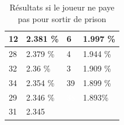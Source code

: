 \documentclass[letterpaper]{article}
\begin{document}
\begin{table}[h]
\begin{tabular}{|l|l||l|l|}
	  \cellcolor[HTML]{FF69B4} 12 & 2.381 \%  & \cellcolor[HTML]{E6E6FA}  6 & 1.997 \% \\ \hline
	  \cellcolor[HTML]{FFD700} 28 & 2.379 \%  & \cellcolor[HTML]{A0522D}  4 & 1.944 \% \\ \hline
	  \cellcolor[HTML]{2E8B57} 32 & 2.36 \%   & \cellcolor[HTML]{EEEED1}  3 & 1.909 \% \\ \hline
	  \cellcolor[HTML]{EEEED1} 34 & 2.354 \%  & \cellcolor[HTML]{8B1A1A} 39 & 1.899 \% \\ \hline
	  \cellcolor[HTML]{FFFFF0} 29 & 2.346 \%  & \cellcolor[HTML]{483D8B} \textcolor{white}{38} & 1.893\%  \\ \hline
	  \cellcolor[HTML]{BEBEBE} 31 & 2.345 \\ \cline{1-2}
	\end{tabular}
	\caption{Résultats si le joueur ne paye pas pour sortir de prison}
	\label{result_paye_pas}
      \end{table}
	
\end{document}
